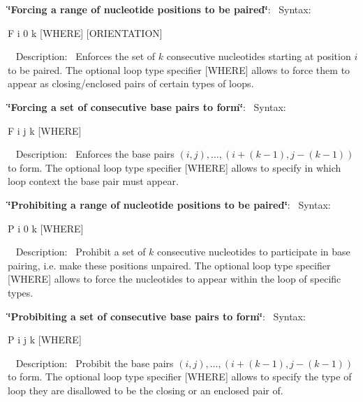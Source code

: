 \begin{DoxyEnumerate}
\item {\bfseries \char`\"{}\+Forcing a range of nucleotide positions to be paired\char`\"{}}\+:~\newline
 Syntax\+:
\begin{DoxyCode}
F i 0 k [WHERE] [ORIENTATION] 
\end{DoxyCode}
~\newline
 Description\+:~\newline
 Enforces the set of $ k $ consecutive nucleotides starting at position $ i $ to be paired. The optional loop type specifier {\ttfamily }\mbox{[}W\+H\+E\+RE\mbox{]} allows to force them to appear as closing/enclosed pairs of certain types of loops.
\item {\bfseries \char`\"{}\+Forcing a set of consecutive base pairs to form\char`\"{}}\+:~\newline
 Syntax\+:\begin{DoxyVerb}F i j k [WHERE] \end{DoxyVerb}
~\newline
 Description\+:~\newline
 Enforces the base pairs $ (i,j), \ldots, (i+(k-1), j-(k-1)) $ to form. The optional loop type specifier {\ttfamily }\mbox{[}W\+H\+E\+RE\mbox{]} allows to specify in which loop context the base pair must appear.
\item {\bfseries \char`\"{}\+Prohibiting a range of nucleotide positions to be paired\char`\"{}}\+:~\newline
 Syntax\+:\begin{DoxyVerb}P i 0 k [WHERE] \end{DoxyVerb}
~\newline
 Description\+:~\newline
 Prohibit a set of $ k $ consecutive nucleotides to participate in base pairing, i.\+e. make these positions unpaired. The optional loop type specifier {\ttfamily }\mbox{[}W\+H\+E\+RE\mbox{]} allows to force the nucleotides to appear within the loop of specific types.
\item {\bfseries \char`\"{}\+Probibiting a set of consecutive base pairs to form\char`\"{}}\+:~\newline
 Syntax\+:\begin{DoxyVerb}P i j k [WHERE] \end{DoxyVerb}
~\newline
 Description\+:~\newline
 Probibit the base pairs $ (i,j), \ldots, (i+(k-1), j-(k-1)) $ to form. The optional loop type specifier {\ttfamily }\mbox{[}W\+H\+E\+RE\mbox{]} allows to specify the type of loop they are disallowed to be the closing or an enclosed pair of.

\end{DoxyEnumerate}
